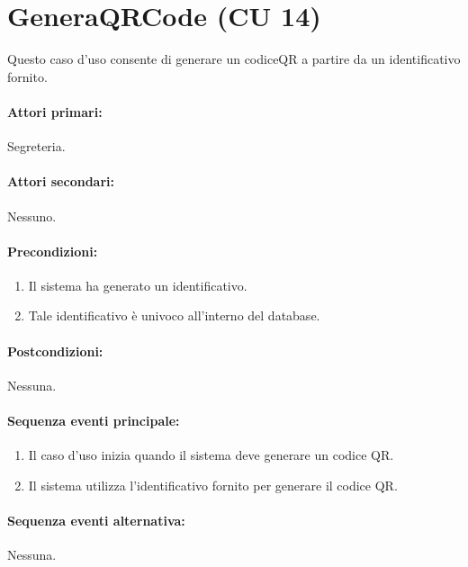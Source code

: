 \documentclass{article}
\begin{document}
\section*{GeneraQRCode (CU 14)}
	
	\indent\indent Questo caso d'uso consente di generare un codiceQR a partire da un identificativo fornito.
	
	\paragraph{Attori primari:}Segreteria.
	
	\paragraph{Attori secondari:}Nessuno.
	
	\paragraph{Precondizioni:}
	\begin{enumerate}[itemsep=8pt,parsep=0pt]
	\item Il sistema ha generato un identificativo. %
		
		\item Tale identificativo è univoco all'interno del database.
	\end{enumerate}

	
	\paragraph{Postcondizioni:}Nessuna.
	
	\paragraph{Sequenza eventi principale:}

	\begin{enumerate}[itemsep=8pt,parsep=0pt]
		\item Il caso d'uso inizia quando il sistema deve generare un codice QR.
		\item Il sistema utilizza l'identificativo fornito per generare il codice QR.
	\end{enumerate}
	
	\paragraph{Sequenza eventi alternativa:}Nessuna.
\end{document}
